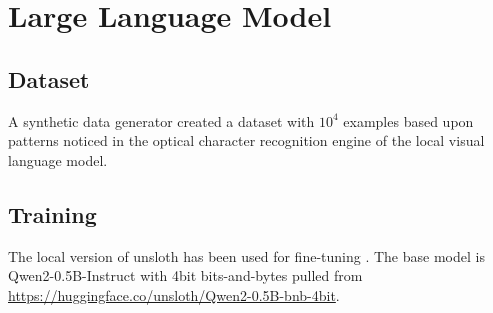 \documentclass[a4paper,11pt]{report}
\begin{document}
            
    \chapter{Large Language Model}
    
        \section{Dataset}
            A synthetic data generator created a dataset with $10^{4}$ examples based upon patterns noticed in the optical character recognition engine of the local visual language model.
    
        \section{Training}
            The local version of unsloth \cite{unsloth} has been used for fine-tuning \cite{finetuning} \cite{finetune_qwen2}. The base model is Qwen2-0.5B-Instruct \cite{qwen2} with 4bit bits-and-bytes \cite{bitsandbytes} pulled from \url{https://huggingface.co/unsloth/Qwen2-0.5B-bnb-4bit}.
\end{document}
